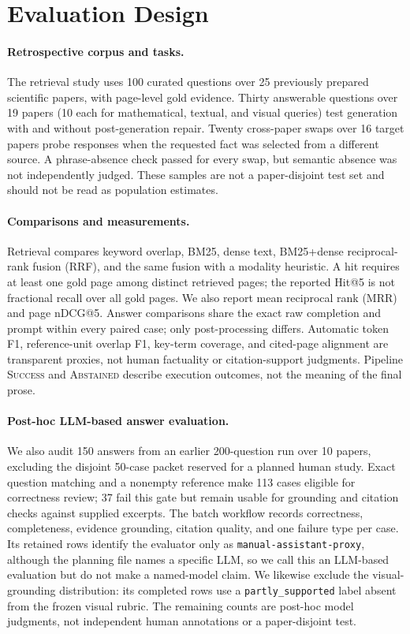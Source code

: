 \section{Evaluation Design}
\paragraph{Retrospective corpus and tasks.}
The retrieval study uses 100 curated questions over 25 previously prepared scientific papers, with page-level gold evidence. Thirty answerable questions over 19 papers (10 each for mathematical, textual, and visual queries) test generation with and without post-generation repair. Twenty cross-paper swaps over 16 target papers probe responses when the requested fact was selected from a different source. A phrase-absence check passed for every swap, but semantic absence was not independently judged. These samples are not a paper-disjoint test set and should not be read as population estimates.

\paragraph{Comparisons and measurements.}
Retrieval compares keyword overlap, BM25, dense text, BM25+dense reciprocal-rank fusion (RRF), and the same fusion with a modality heuristic. A hit requires at least one gold page among distinct retrieved pages; the reported Hit@5 is not fractional recall over all gold pages. We also report mean reciprocal rank (MRR) and page nDCG@5. Answer comparisons share the exact raw completion and prompt within every paired case; only post-processing differs. Automatic token F1, reference-unit overlap F1, key-term coverage, and cited-page alignment are transparent proxies, not human factuality or citation-support judgments. Pipeline \textsc{Success} and \textsc{Abstained} describe execution outcomes, not the meaning of the final prose.

\paragraph{Post-hoc LLM-based answer evaluation.}
We also audit 150 answers from an earlier 200-question run over 10 papers, excluding the disjoint 50-case packet reserved for a planned human study. Exact question matching and a nonempty reference make 113 cases eligible for correctness review; 37 fail this gate but remain usable for grounding and citation checks against supplied excerpts. The batch workflow records correctness, completeness, evidence grounding, citation quality, and one failure type per case. Its retained rows identify the evaluator only as \texttt{manual-assistant-proxy}, although the planning file names a specific LLM, so we call this an LLM-based evaluation but do not make a named-model claim. We likewise exclude the visual-grounding distribution: its completed rows use a \texttt{partly\_supported} label absent from the frozen visual rubric. The remaining counts are post-hoc model judgments, not independent human annotations or a paper-disjoint test.

